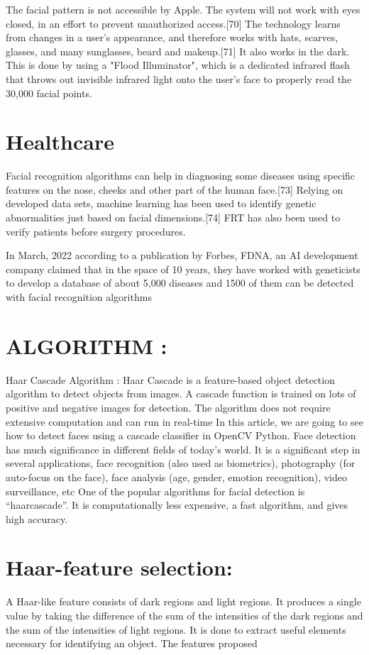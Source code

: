 The facial pattern is not accessible by Apple. The system will not work with eyes closed, in an effort to prevent unauthorized access.[70] The technology learns from changes in a user's appearance, and therefore works with hats, scarves, glasses, and many sunglasses, beard and makeup.[71] It also works in the dark. This is done by using a "Flood Illuminator", which is a dedicated infrared flash that throws out invisible infrared light onto the user's face to properly read the 30,000 facial points.
\newpage
\section{Healthcare}
Facial recognition algorithms can help in diagnosing some diseases using specific features on the nose, cheeks and other part of the human face.[73] Relying on developed data sets, machine learning has been used to identify genetic abnormalities just based on facial dimensions.[74] FRT has also been used to verify patients before surgery procedures.

In March, 2022 according to a publication by Forbes, FDNA, an AI development company claimed that in the space of 10 years, they have worked with geneticists to develop a database of about 5,000 diseases and 1500 of them can be detected with facial recognition algorithms
\newpage
\section{ALGORITHM :}
{Haar Cascade Algorithm :} Haar Cascade is a feature-based object detection algorithm to detect objects from images. A cascade function is trained
on lots of positive and negative images for detection. The algorithm does not require extensive computation and can run
in real-time
In this article, we are going to see how to detect faces using a cascade classifier in OpenCV Python. Face detection has
much significance in different fields of today’s world. It is a significant step in several applications, face recognition
(also used as biometrics), photography (for auto-focus on the face), face analysis (age, gender, emotion recognition),
video surveillance, etc
One of the popular algorithms for facial detection is “haarcascade”. It is computationally less expensive, a fast
algorithm, and gives high accuracy.

\section{Haar-feature selection:}A Haar-like feature consists of dark regions and light regions. It produces a single value by taking the difference of
the sum of the intensities of the dark regions and the sum of the intensities of light regions. It is done to extract
useful elements necessary for identifying an object. The features proposed 
\newpage
